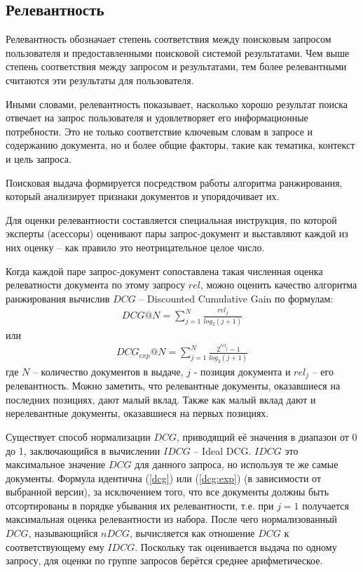 \documentclass[diploma]{nanolab2015}
\begin{document}
\subsection{Релевантность}
Релевантность обозначает степень соответствия между поисковым запросом пользователя и предоставленными поисковой системой результатами. Чем выше степень соответствия между запросом и результатами, тем более релевантными считаются эти результаты для пользователя.

Иными словами, релевантность показывает, насколько хорошо результат поиска отвечает на запрос пользователя и удовлетворяет его информационные потребности. Это не только соответствие ключевым словам в запросе и содержанию документа, но и более общие факторы, такие как тематика, контекст и цель запроса.

Поисковая выдача формируется посредством работы алгоритма ранжирования, который анализирует признаки документов и упорядочивает их.

Для оценки релевантности составляется специальная инструкция, по которой эксперты (асессоры) оценивают пары запрос-документ и выставляют каждой из них оценку -- как правило это неотрицательное целое число.

Когда каждой паре запрос-документ сопоставлена такая численная оценка релеватности документа по этому запросу $rel$, можно оценить качество алгоритма ранжирования вычислив $DCG$ -- Discounted Cumulative Gain по формулам:
\begin{align}
    DCG@N = \sum_{j=1}^{N} \frac{rel_j}{log_2(j+1)} \label{dcg}
\end{align}
или
\begin{align}
    DCG_{exp}@N = \sum_{j=1}^{N} \frac{2^{rel_j} - 1}{log_2(j+1)} \label{dcg:exp}
\end{align}
где $N$ -- количество документов в выдаче, $j$ - позиция документа и $rel_j$ -- его релевантность. Можно заметить, что релевантные документы, оказавшиеся на последних позициях, дают малый вклад. Также как малый вклад дают и нерелевантные документы, оказавшиеся на первых позициях.

Существует способ нормализации $DCG$, приводящий её значения в диапазон от 0 до 1, заключающийся в вычислении $IDCG$ -- Ideal DCG. $IDCG$ это максимальное значение $DCG$ для данного запроса, но используя те же самые документы. Формула идентична (\ref{dcg}) или (\ref{dcg:exp}) (в зависимости от выбранной версии), за исключением того, что все документы должны быть отсортированы в порядке убывания их релевантности, т.е. при $j=1$ получается максимальная оценка релевантности из набора.
После чего нормализованный $DCG$, называющийся $nDCG$, вычисляется как отношение $DCG$ к соответствующему ему $IDCG$. Поскольку так оценивается выдача по одному запросу, для оценки по группе запросов берётся среднее арифметическое.
\end{document}
